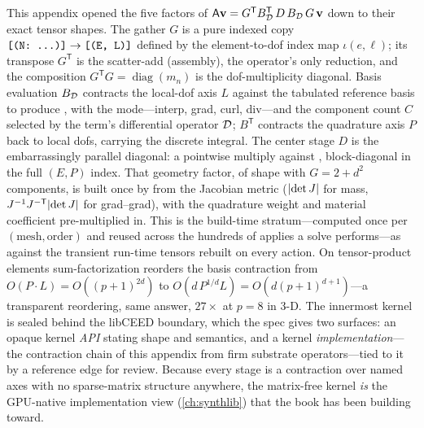 \summarysection
This appendix opened the five factors of $\mathsf{A}\mathbf{v}=
G^{\mathsf T}B_{\mathcal{D}}^{\mathsf T}\,D\,B_{\mathcal{D}}\,G\,\mathbf{v}$ down to their exact
tensor shapes. The gather $G$ is a pure indexed copy
$\texttt{[(N: \dots)]}\to\texttt{[(E, L)]}$ defined by the element-to-dof index map
$\iota(e,\ell)$; its transpose $G^{\mathsf T}$ is the scatter-add (assembly), the
operator's only reduction, and the composition $G^{\mathsf T}G=\operatorname{diag}
(m_n)$ is the dof-multiplicity diagonal. Basis evaluation $B_{\mathcal{D}}$ contracts
the local-dof axis $L$ against the tabulated reference basis to produce
\code{[(E, P, C)]}, with the mode---interp, grad, curl, div---and the component
count $C$ selected by the term's differential operator $\mathcal{D}$; $B^{\mathsf T}$
contracts the quadrature axis $P$ back to local dofs, carrying the discrete
integral. The center stage $D$ is the embarrassingly parallel diagonal: a pointwise
multiply against , block-diagonal in the full $(E,P)$ index. That
geometry factor, of shape \code{[(E, P, G)]} with $G=2+d^2$ components, is built
once by  from the Jacobian metric
($\lvert\det J\rvert$ for mass, $J^{-1}J^{-\mathsf T}\lvert\det J\rvert$ for grad--grad), with
the quadrature weight and material coefficient pre-multiplied in. This is the
build-time stratum---computed once per $(\text{mesh},\text{order})$ and reused
across the hundreds of applies a solve performs---as against the transient run-time
tensors rebuilt on every action. On tensor-product elements sum-factorization
reorders the basis contraction from $O(P\cdot L)=O((p+1)^{2d})$ to
$O(d\,P^{1/d}L)=O(d(p+1)^{d+1})$---a transparent reordering, same answer, $27\times$
at $p=8$ in 3-D. The innermost kernel is sealed behind the libCEED boundary, which
the spec gives two surfaces: an opaque  kernel \emph{API} stating
shape and semantics, and a kernel \emph{implementation}---the contraction chain of
this appendix from firm substrate operators---tied to it by a
 reference edge for review. Because every stage is a
contraction over named axes with no sparse-matrix structure anywhere, the
matrix-free kernel \emph{is} the GPU-native implementation view (\cref{ch:synthlib})
that the book has been building toward.

